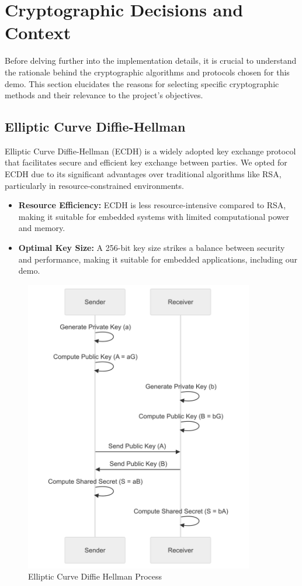 \section{Cryptographic Decisions and Context}
Before delving further into the implementation details, it is crucial to understand the rationale behind the cryptographic algorithms and protocols chosen for this demo. This section elucidates the reasons for selecting specific cryptographic methods and their relevance to the project's objectives.

\subsection{Elliptic Curve Diffie-Hellman}
Elliptic Curve Diffie-Hellman (ECDH) is a widely adopted key exchange protocol that facilitates secure and efficient key exchange between parties. We opted for ECDH due to its significant advantages over traditional algorithms like RSA, particularly in resource-constrained environments.

\begin{itemize}
    \item \textbf{Resource Efficiency:} ECDH is less resource-intensive compared to RSA, making it suitable for embedded systems with limited computational power and memory.
     \item \textbf{Optimal Key Size:} A 256-bit key size strikes a balance between security and performance, making it suitable for embedded applications, including our demo.
    
\end{itemize}

\begin{figure}[H]
    \centering
    \includegraphics[width=10cm]{img/ECDH.png}
    \caption{Elliptic Curve Diffie Hellman Process}
    \label{fig:ecdh_graph}
\end{figure} 

